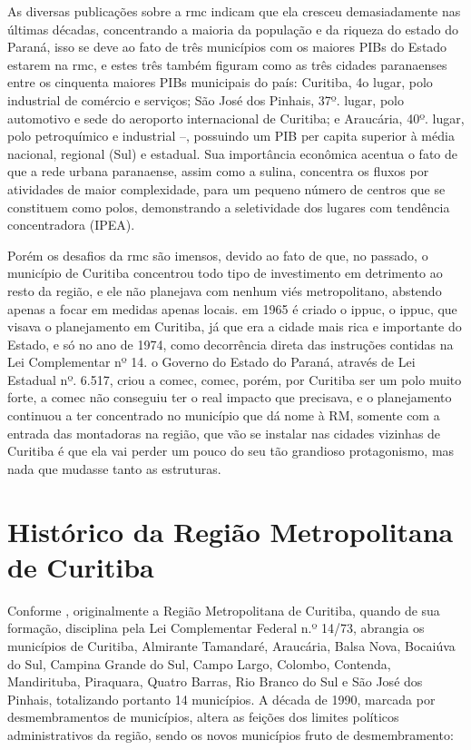 	As diversas publicações sobre a \gls{rmc} indicam que ela cresceu demasiadamente nas últimas décadas, concentrando a maioria da população e da riqueza do estado do Paraná, isso se deve ao fato de três municípios com os maiores PIBs do Estado estarem na \gls{rmc}, e estes três também figuram como as três cidades paranaenses entre os cinquenta maiores PIBs municipais do país: Curitiba, 4o lugar, polo industrial de comércio e serviços; São José dos Pinhais, 37º. lugar, polo automotivo e sede do aeroporto internacional de Curitiba; e Araucária, 40º. lugar, polo petroquímico e industrial –, possuindo um PIB per capita superior à média nacional, regional (Sul) e estadual. Sua importância econômica acentua o fato de que a rede urbana paranaense, assim como a sulina, concentra os fluxos por atividades de maior complexidade, para um pequeno número de centros que se constituem como polos, demonstrando a seletividade dos lugares com tendência concentradora (IPEA).
	
	Porém os desafios da \gls{rmc} são imensos, devido ao fato de que, no passado, o município de Curitiba concentrou todo tipo de investimento em detrimento ao resto da região, e ele não planejava com nenhum viés metropolitano, abstendo apenas a focar em medidas apenas locais. em 1965 é criado o \glsdesc{ippuc}, o \gls{ippuc}, que  visava o planejamento em Curitiba, já que era a cidade mais rica e importante do Estado, e só no ano de 1974, como decorrência direta das instruções contidas na Lei Complementar nº 14. o Governo do Estado do Paraná, através de Lei Estadual nº. 6.517, criou a \glsdesc{comec}, \gls{comec}, porém, por Curitiba ser um polo muito forte, a \gls{comec} não conseguiu ter o real impacto que precisava, e o planejamento continuou a ter concentrado no município que dá nome à RM, somente com a entrada das montadoras na região, que vão se instalar nas cidades vizinhas de Curitiba é que ela vai perder um pouco do seu tão grandioso protagonismo, mas nada que mudasse tanto as estruturas. 

	\section{Histórico da Região Metropolitana de Curitiba}
	
	Conforme , originalmente a Região Metropolitana de Curitiba, quando de sua formação, disciplina pela Lei Complementar Federal n.º 14/73, abrangia os municípios de Curitiba, Almirante Tamandaré, Araucária, Balsa Nova, Bocaiúva do Sul, Campina Grande do Sul, Campo Largo, Colombo, Contenda, Mandirituba, Piraquara, Quatro Barras, Rio Branco do Sul e São José dos Pinhais, totalizando portanto 14 municípios. A década de 1990, marcada por desmembramentos de municípios, altera as feições dos limites políticos administrativos da região, sendo os novos municípios fruto de desmembramento:
	
